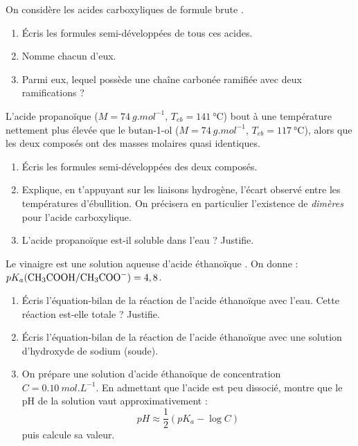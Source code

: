 \documentclass[11pt]{article}
\begin{document}
\begin{exercice}
On considère les acides carboxyliques de formule brute .
\begin{enumerate}
\item Écris les formules semi-développées de tous ces acides.
\item Nomme chacun d'eux.
\item Parmi eux, lequel possède une chaîne carbonée ramifiée avec deux ramifications ?
\end{enumerate}
\end{exercice}

\begin{exercice}
L'acide propanoïque ($M = \SI{74}{g.mol^{-1}}$, $T_{eb} = \SI{141}{\celsius}$) bout à une température nettement plus élevée que le butan-1-ol ($M = \SI{74}{g.mol^{-1}}$, $T_{eb} = \SI{117}{\celsius}$), alors que les deux composés ont des masses molaires quasi identiques.
\begin{enumerate}
\item Écris les formules semi-développées des deux composés.
\item Explique, en t'appuyant sur les liaisons hydrogène, l'écart observé entre les températures d'ébullition. On précisera en particulier l'existence de \emph{dimères} pour l'acide carboxylique.
\item L'acide propanoïque est-il soluble dans l'eau ? Justifie.
\end{enumerate}
\end{exercice}

\begin{exercice}
Le vinaigre est une solution aqueuse d'acide éthanoïque . On donne : $pK_a(\ce{CH3COOH}/\ce{CH3COO-}) = 4,8$.
\begin{enumerate}
\item Écris l'équation-bilan de la réaction de l'acide éthanoïque avec l'eau. Cette réaction est-elle totale ? Justifie.
\item Écris l'équation-bilan de la réaction de l'acide éthanoïque avec une solution d'hydroxyde de sodium (soude).
\item On prépare une solution d'acide éthanoïque de concentration $C = \SI{0,10}{mol.L^{-1}}$. En admettant que l'acide est peu dissocié, montre que le pH de la solution vaut approximativement :
\[ pH \approx \dfrac{1}{2}\left(pK_a - \log C\right) \]
puis calcule sa valeur.
\end{enumerate}
\end{exercice}
\end{document}
